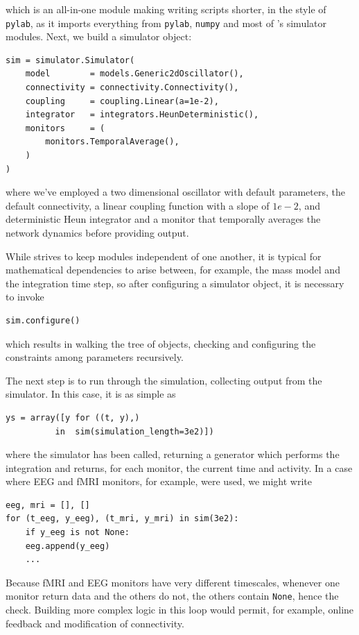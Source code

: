 \noindent which is an all-in-one module making writing scripts
shorter, in the style of \texttt{pylab}, as it imports everything
from \texttt{pylab}, \texttt{numpy} and most of \TVB's simulator
modules. Next, we build a simulator object:

\begin{lstlisting}
sim = simulator.Simulator(
    model        = models.Generic2dOscillator(), 
    connectivity = connectivity.Connectivity(),
    coupling     = coupling.Linear(a=1e-2),
    integrator   = integrators.HeunDeterministic(),
    monitors     = (
        monitors.TemporalAverage(), 
    )
)
\end{lstlisting}

\noindent where we've employed a two dimensional oscillator
with default parameters, the default connectivity, a linear 
coupling function with a slope of $1e-2$, and deterministic
Heun integrator and a monitor that temporally averages the 
network dynamics before providing output.

While \TVB strives to keep modules independent of one another,
it is typical for mathematical dependencies to arise between, 
for example, the mass model and the integration time step, so
after configuring a simulator object, it is necessary to invoke

\begin{lstlisting}
sim.configure()
\end{lstlisting}

which results in walking the tree of objects, checking and 
configuring the constraints among parameters recursively.

The next step is to run through the simulation, collecting
output from the simulator. In this case, it is as simple as
\begin{lstlisting}
ys = array([y for ((t, y),) 
	      in  sim(simulation_length=3e2)])
\end{lstlisting}
\noindent where the simulator has been called, returning a 
generator which performs the integration and returns, for each
monitor, the current time and activity. In a case where EEG 
and fMRI monitors, for example, were used, we might write
\begin{lstlisting}
eeg, mri = [], []
for (t_eeg, y_eeg), (t_mri, y_mri) in sim(3e2):
    if y_eeg is not None:
	eeg.append(y_eeg)
    ...
\end{lstlisting}
\noindent Because fMRI and EEG monitors have very different
timescales, whenever one monitor return data and the others do
not, the others contain \texttt{None}, hence the check. Building
more complex logic in this loop would permit, for example, online
feedback and modification of connectivity. 

